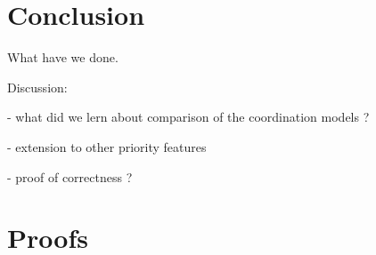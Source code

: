 \documentclass{llncs}
\begin{document}


\section{Conclusion}
\label{secn:conclusion}

What have we done.

Discussion:

- what did we lern about comparison of the coordination models ?

- extension to other priority features

- proof of correctness ?





\appendix
\clearpage


\section{Proofs}
\label{secn:proofs}
\end{document}
